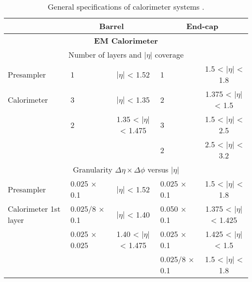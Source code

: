 \begin{table}[] \tiny \centering
\caption{General specifications of calorimeter systems \cite{atlas_tdr}.}
\label{tab:cal_specs}
\begin{tabular}{|l|lc|lc|}
\hline 
                                               &                  \multicolumn{2}{c|}{\textbf{Barrel}}            &           \multicolumn{2}{c|}{\textbf{End-cap}}                                 \\
\hline 
                                               \multicolumn{5}{|c|}{\textbf{EM Calorimeter}} \\
\hline 
                                               \multicolumn{5}{|c|}{Number of layers and $|\eta|$ coverage} \\
\hline 
Presampler                                     & 1                 & $|\eta|$ < 1.52                 & 1                               & 1.5 < $|\eta|$ < 1.8     \\
Calorimeter                                    & 3                 & $|\eta|$ < 1.35                 & 2                               & 1.375 < $|\eta|$ < 1.5   \\
                                               & 2                 & 1.35 < $|\eta|$ < 1.475 & 3                                       & 1.5 < $|\eta|$ < 2.5     \\
                                               &                   &                                 & 2                            & 2.5 < $|\eta|$ < 3.2     \\
\hline 
                                               \multicolumn{5}{|c|}{Granularity $\Delta \eta \times \Delta \phi$ versus $|\eta|$} \\
\hline 
Presampler                                     & 0.025 × 0.1       & $|\eta|$ < 1.52                 & 0.025 × 0.1                     & 1.5 < $|\eta|$ < 1.8     \\
Calorimeter 1st layer                          & 0.025/8 × 0.1     & $|\eta|$ < 1.40                 & 0.050 × 0.1                     & 1.375 < $|\eta|$ < 1.425 \\
                                               & 0.025 × 0.025     & 1.40 < $|\eta|$ < 1.475 & 0.025 × 0.1                             & 1.425 < $|\eta|$ < 1.5   \\
                                               &                   &                                    & 0.025/8 × 0.1                   & 1.5 < $|\eta|$ < 1.8     \\

\end{tabular}
\end{table}
